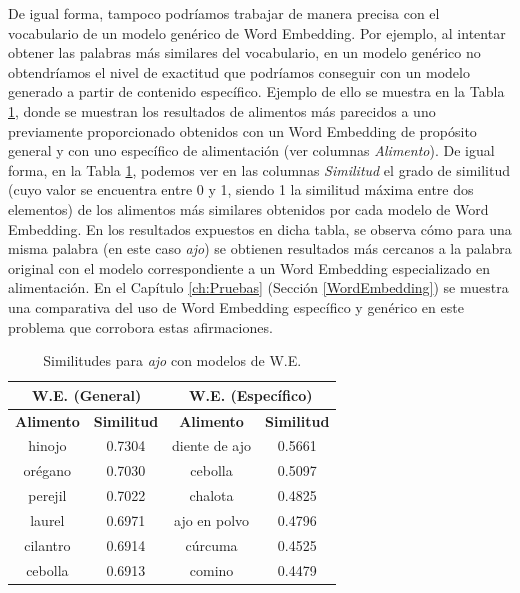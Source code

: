 De igual forma, tampoco podríamos trabajar de manera precisa con el vocabulario de un modelo genérico de Word Embedding. Por ejemplo, al intentar obtener las palabras más similares del vocabulario, en un modelo genérico no obtendríamos el nivel de exactitud que podríamos conseguir con un modelo generado a partir de contenido específico. Ejemplo de ello se muestra en la Tabla \ref{table1}, donde se muestran los resultados de alimentos más parecidos a uno previamente proporcionado obtenidos con un Word Embedding de propósito general y con uno específico de alimentación (ver columnas \textit{Alimento}). De igual forma, en la Tabla \ref{table1}, podemos ver en las columnas \textit{Similitud} el grado de similitud (cuyo valor se encuentra entre 0 y 1, siendo 1 la similitud máxima entre dos elementos) de los alimentos más similares obtenidos por cada modelo de Word Embedding. En los resultados expuestos en dicha tabla, se observa cómo para una misma palabra (en este caso \textit{ajo}) se obtienen resultados más cercanos a la palabra original con el modelo correspondiente a un Word Embedding especializado en alimentación. En el Capítulo \ref{ch:Pruebas} (Sección \ref{WordEmbedding}) se muestra una comparativa del uso de Word Embedding específico y genérico en este problema que corrobora estas afirmaciones.

\setlength{\tabcolsep}{10pt} 
\begin{table}[h]
\caption{\label{table1}Similitudes para \textit{ajo} con modelos de W.E.}
\centering
\begin{tabular}{cccc}
\hline
\multicolumn{2}{c}{\textbf{W.E. (General)}} & \multicolumn{2}{c}{\textbf{W.E. (Específico)}} \\ \hline
 \textbf{Alimento} & \textbf{Similitud} & \textbf{Alimento} & \textbf{Similitud} \\ \hline \hline
hinojo & 0.7304 &  diente de ajo & 0.5661 \\ \hline
orégano & 0.7030 &  cebolla & 0.5097 \\ \hline
perejil & 0.7022 &  chalota & 0.4825 \\ \hline
laurel & 0.6971 & ajo en polvo& 0.4796 \\ \hline
cilantro & 0.6914 & cúrcuma & 0.4525 \\ \hline
cebolla & 0.6913 &  comino & 0.4479 \\ \hline
\end{tabular}
\end{table}

